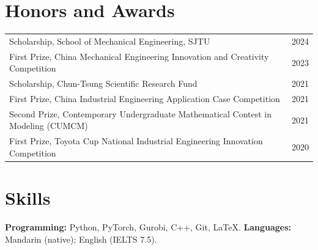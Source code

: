 \documentclass[11pt,letterpaper]{article}
\begin{document}
\section*{Honors and Awards}

\begin{tabularx}{\linewidth}{@{}Xr@{}}
  Scholarship, School of Mechanical Engineering, SJTU & 2024 \\
  First Prize, China Mechanical Engineering Innovation and Creativity Competition & 2023 \\
  Scholarship, Chun-Tsung Scientific Research Fund & 2021 \\
  First Prize, China Industrial Engineering Application Case Competition & 2021 \\
  Second Prize, Contemporary Undergraduate Mathematical Contest in Modeling (CUMCM) & 2021 \\
  First Prize, Toyota Cup National Industrial Engineering Innovation Competition & 2020 \\
\end{tabularx}

\section*{Skills}

\textbf{Programming:} Python, PyTorch, Gurobi, C++, Git, \LaTeX. \enspace \textbf{Languages:} Mandarin (native); English (IELTS 7.5).
\end{document}
